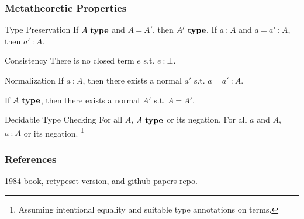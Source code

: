 \documentclass[mathserif]{beamer}
\newcommand{\istype}[1]{\ensuremath{#1 ~\textbf{\textrm{type}}}}
\newcommand{\isterm}[2]{\ensuremath{#1 ~\textbf{{:}}~ #2}}
\newcommand{\eqtype}[2]{\ensuremath{#1 ~\textbf{=}~ #2}}
\newcommand{\eqterm}[3]{\ensuremath{#1 ~\textbf{=}~ #2 ~\textbf{{:}}~ #3}}
\newcommand{\Bot}[0]{\ensuremath{\bot}}
\begin{document}
\begin{frame}
\frametitle{Metatheoretic Properties}

\begin{block}{Type Preservation}
  If \istype{A} and \eqtype{A}{A'}, then \istype{A'}.
  If \isterm{a}{A} and \eqterm{a}{a'}{A}, then \isterm{a'}{A}.
\end{block}

\begin{block}{Consistency}
There is no closed term $e$ s.t. \isterm{e}{\Bot}.
\end{block}

\begin{block}{Normalization}
  If \isterm{a}{A}, then there exists a normal
  $a'$ s.t. \eqterm{a}{a'}{A}.

  If \istype{A}, then there exists a normal
  $A'$ s.t. \eqtype{A}{A'}.
\end{block}

\begin{block}{Decidable Type Checking}
  For all $A$, \istype{A} or its negation.
  For all $a$ and $A$, \isterm{a}{A} or its negation.
  \footnote{
    Assuming intentional equality
    and suitable type annotations on terms.
  }
\end{block}

\end{frame}

\begin{frame}
\frametitle{References}

1984 book, retypeset version,
and github papers repo.

\end{frame}
\end{document}
